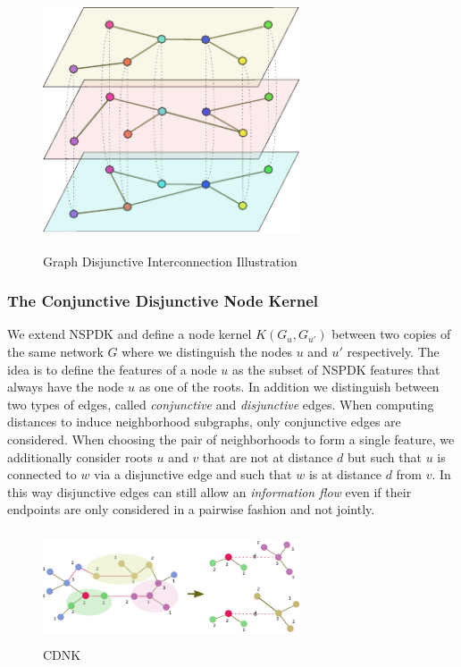 \begin{figure}
\includegraphics[height= 3in, width=3in]{multilayers.pdf}
\caption{Graph Disjunctive Interconnection Illustration}
\label{fig:03}
\end{figure}

\subsubsection{The Conjunctive Disjunctive Node Kernel}
We extend NSPDK and define a node kernel $K(G_u,G_{u'})$ between two copies of the same network $G$ where we distinguish the nodes $u$ and $u'$ respectively. The idea is to define the features of a node $u$ as the subset of NSPDK features that always have the node $u$ as one of the roots. In addition we distinguish between two types of edges, called {\em conjunctive} and {\em disjunctive} edges. When computing distances to induce neighborhood subgraphs, only conjunctive edges are considered. When choosing the
pair of neighborhoods to form a single feature, we additionally consider roots $u$ and $v$ that are not at distance $d$ but such that $u$ is connected to $w$ via a disjunctive edge and such that $w$ is at distance $d$ from $v$. In this way disjunctive edges can still allow an {\em information flow} even if their
endpoints are only considered in a pairwise fashion and not jointly. 

\begin{figure}
\includegraphics[height= 1.3in, width=3in]{cdnk.pdf}
\caption{CDNK}
\label{fig:04}
\end{figure}


